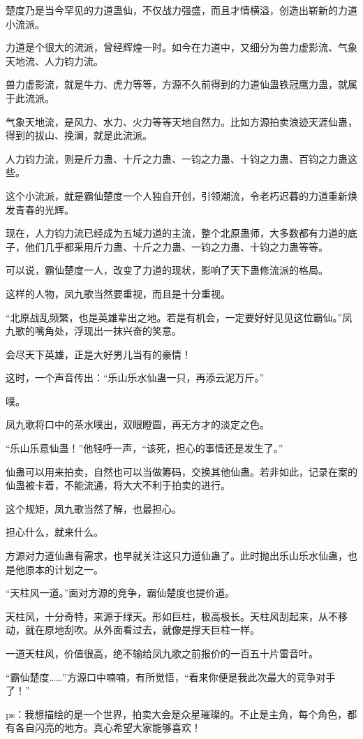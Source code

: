 \begin{this_body}
楚度乃是当今罕见的力道蛊仙，不仅战力强盛，而且才情横溢，创造出崭新的力道小流派。

力道是个很大的流派，曾经辉煌一时。如今在力道中，又细分为兽力虚影流、气象天地流、人力钧力流。

兽力虚影流，就是牛力、虎力等等，方源不久前得到的力道仙蛊铁冠鹰力蛊，就属于此流派。

气象天地流，是风力、水力、火力等等天地自然力。比如方源拍卖浪迹天涯仙蛊，得到的拔山、挽澜，就是此流派。

人力钧力流，则是斤力蛊、十斤之力蛊、一钧之力蛊、十钧之力蛊、百钧之力蛊这些。

这个小流派，就是霸仙楚度一个人独自开创，引领潮流，令老朽迟暮的力道重新焕发青春的光辉。

现在，人力钧力流已经成为五域力道的主流，整个北原蛊师，大多数都有力道的底子，他们几乎都采用斤力蛊、十斤之力蛊、一钧之力蛊、十钧之力蛊等等。

可以说，霸仙楚度一人，改变了力道的现状，影响了天下蛊修流派的格局。

这样的人物，凤九歌当然要重视，而且是十分重视。

“北原战乱频繁，也是英雄辈出之地。若是有机会，一定要好好见见这位霸仙。”凤九歌的嘴角处，浮现出一抹兴奋的笑意。

会尽天下英雄，正是大好男儿当有的豪情！

这时，一个声音传出：“乐山乐水仙蛊一只，再添云泥万斤。”

噗。

凤九歌将口中的茶水噗出，双眼瞪圆，再无方才的淡定之色。

“乐山乐意仙蛊！”他轻呼一声，“该死，担心的事情还是发生了。”

仙蛊可以用来拍卖，自然也可以当做筹码，交换其他仙蛊。若非如此，记录在案的仙蛊被卡着，不能流通，将大大不利于拍卖的进行。

这个规矩，凤九歌当然了解，也最担心。

担心什么，就来什么。

方源对力道仙蛊有需求，也早就关注这只力道仙蛊了。此时抛出乐山乐水仙蛊，也是他原本的计划之一。

“天柱风一道。”面对方源的竞争，霸仙楚度也提价道。

天柱风，十分奇特，来源于绿天。形如巨柱，极高极长。天柱风刮起来，从不移动，就在原地刮吹。从外面看过去，就像是撑天巨柱一样。

一道天柱风，价值很高，绝不输给凤九歌之前报价的一百五十片雷音叶。

“霸仙楚度……”方源口中喃喃，有所觉悟，“看来你便是我此次最大的竞争对手了！”

ps：我想描绘的是一个世界，拍卖大会是众星璀璨的。不止是主角，每个角色，都有各自闪亮的地方。真心希望大家能够喜欢！

\end{this_body}

